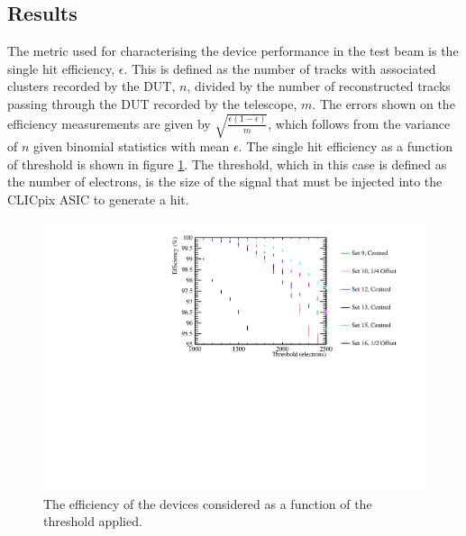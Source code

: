 
\subsection{Results}
The metric used for characterising the device performance in the test beam is the single hit efficiency, $\epsilon$.  This is defined as the number of tracks with associated clusters recorded by the DUT, $n$, divided by the number of reconstructed tracks passing through the DUT recorded by the telescope, $m$. The errors shown on the efficiency measurements are given by $\sqrt{\frac{\epsilon (1 - \epsilon)}{m}}$, which follows from the variance of $n$ given binomial statistics with mean $\epsilon$.  The single hit efficiency as a function of threshold is shown in figure \ref{fig:efficiency}.  The threshold, which in this case is defined as the number of electrons, is the size of the signal that must be injected into the CLICpix ASIC to generate a hit. 

\begin{figure}
\centering
\includegraphics[width=1.0\textwidth]{CLICdpVertex/Plots/TestBeamData/EfficiencyThresholdPlot.pdf}
\caption[The efficiency of the devices considered as a function of the threshold applied.]{The efficiency of the devices considered as a function of the threshold applied.}
\label{fig:efficiency}
\end{figure}

